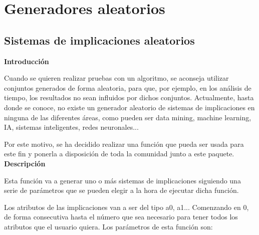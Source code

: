 \section{Generadores aleatorios}

\subsection{Sistemas de implicaciones aleatorios}

    \textbf{Introducci\'on}

    Cuando se quieren realizar pruebas con un algoritmo, se aconseja utilizar conjuntos generados de forma aleatoria, para que, por ejemplo, 
    en los an\'alisis de tiempo, los resultados no sean influidos por dichos conjuntos. Actualmente, hasta donde se conoce, no existe un 
    generador aleatorio de sistemas de implicaciones en ninguna de las diferentes \'areas, como pueden ser data mining, machine learning, 
    IA, sistemas inteligentes, redes neuronales...

    Por este motivo, se ha decidido realizar una funci\'on que pueda ser usada para este fin y ponerla a disposici\'on de toda la comunidad 
    junto a este paquete.
    \\ 


    \textbf{Descripci\'on}
    
    Esta funci\'on va a generar uno o m\'as sistemas de implicaciones siguiendo una serie de par\'ametros que se pueden elegir a la 
    hora de ejecutar dicha funci\'on.

    Los atributos de las implicaciones van a ser del tipo a0, a1... Comenzando en 0, de forma consecutiva hasta el n\'umero que sea 
    necesario para tener todos los atributos que el usuario quiera. Los par\'ametros de esta funci\'on son:

